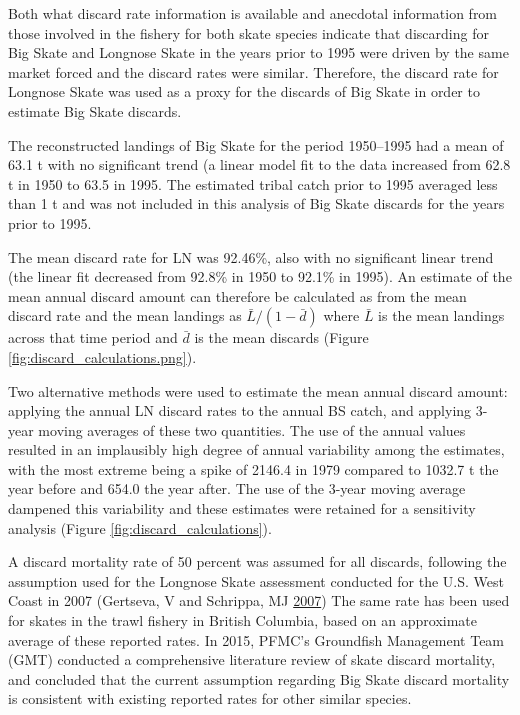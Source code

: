\documentclass[12pt,]{article}
\begin{document}
Both what discard rate information is available and anecdotal
information from those involved in the fishery for both skate species
indicate that discarding for Big Skate and Longnose Skate in the years
prior to 1995 were driven by the same market forced and the discard
rates were similar. Therefore, the discard rate for Longnose Skate was
used as a proxy for the discards of Big Skate in order to estimate Big
Skate discards.

The reconstructed landings of Big Skate for the period 1950--1995 had a
mean of 63.1 t with no significant trend (a linear model fit to the data
increased from 62.8 t in 1950 to 63.5 in 1995. The estimated tribal
catch prior to 1995 averaged less than 1 t and was not included in this
analysis of Big Skate discards for the years prior to 1995.

The mean discard rate for LN was 92.46\%, also with no significant
linear trend (the linear fit decreased from 92.8\% in 1950 to 92.1\% in
1995). An estimate of the mean annual discard amount can therefore be
calculated as from the mean discard rate and the mean landings as
\(\bar{L} / (1 - \bar{d})\) where \(\bar{L}\) is the mean landings
across that time period and \(\bar{d}\) is the mean discards (Figure
\ref{fig:discard_calculations.png}).

Two alternative methods were used to estimate the mean annual discard
amount: applying the annual LN discard rates to the annual BS catch, and
applying 3-year moving averages of these two quantities. The use of the
annual values resulted in an implausibly high degree of annual
variability among the estimates, with the most extreme being a spike of
2146.4 in 1979 compared to 1032.7 t the year before and 654.0 the year
after. The use of the 3-year moving average dampened this variability
and these estimates were retained for a sensitivity analysis (Figure
\ref{fig:discard_calculations}).

A discard mortality rate of 50 percent was assumed for all discards,
following the assumption used for the Longnose Skate assessment
conducted for the U.S. West Coast in 2007 (Gertseva, V and Schrippa, MJ
\protect\hyperlink{ref-Gertseva2007}{2007}) The same rate has been used
for skates in the trawl fishery in British Columbia, based on an
approximate average of these reported rates. In 2015, PFMC's Groundfish
Management Team (GMT) conducted a comprehensive literature review of
skate discard mortality, and concluded that the current assumption
regarding Big Skate discard mortality is consistent with existing
reported rates for other similar species.
\end{document}
